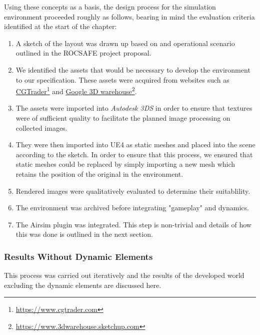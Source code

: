 Using these concepts as a basis, the design process for the simulation environment proceeded roughly as follows, bearing in mind the evaluation criteria identified at the start of the chapter:
\begin{enumerate}
    \item A sketch of the layout was drawn up based on and operational scenario outlined in the ROCSAFE project proposal\cite{rocsafeNUIG}.
    \item We identified the assets that would be necessary to develop the environment to our specification. These assets were acquired from websites such as 
\href{http://www.cgtrader.com}{CGTrader}\footnote{\href {http://www.cgtrader.com}{https://www.cgtrader.com}}
and 
\href{https://3dwarehouse.sketchup.com/?hl=en}{Google 3D warehouse}\footnote{\href {https://3dwarehouse.sketchup.com/?hl=en}{https://www.3dwarehouse.sketchup.com}}.
\item The assets were imported into \emph{Autodesk 3DS} in order to ensure that textures were of sufficient quality to facilitate the planned image processing on collected images.
\item They were then imported into UE4 as static meshes and placed into the scene according to the sketch. In order to ensure that this process, we ensured that static meshes could be replaced by simply importing a new mesh which retains the position of the original in the environment. 
\item Rendered images were qualitatively evaluated to determine their suitablility.
\item The environment was archived before integrating "gameplay" and dynamics.
\item The Airsim\cite{ShahAirSim:Vehicles} plugin was integrated. This step is non-trivial and details of how this was done is outlined in the next section.
\end{enumerate} 
\subsubsection{Results Without Dynamic Elements}
This process was carried out iteratively and the results of the developed world excluding the dynamic elements are discussed here. 

